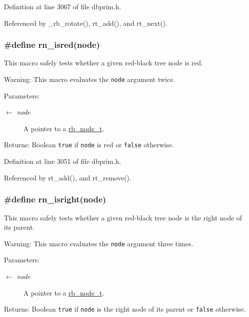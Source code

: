 Definition at line 3067 of file dbprim.h.

Referenced by \_\-rb\_\-rotate(), rt\_\-add(), and rt\_\-next().\hypertarget{group__dbprim__rbtree_ga41}{
\subsubsection[rn\_\-isred]{\setlength{\rightskip}{0pt plus 5cm}\#define rn\_\-isred(node)}}
\label{group__dbprim__rbtree_ga41}


This macro safely tests whether a given red-black tree node is red.

\begin{Desc}
\item[Warning:]This macro evaluates the {\tt node} argument twice.\end{Desc}
\begin{Desc}
\item[Parameters:]
\begin{description}
\item[\mbox{$\leftarrow$} {\em node}]A pointer to a \hyperlink{group__dbprim__rbtree_ga1}{rb\_\-node\_\-t}.\end{description}
\end{Desc}
\begin{Desc}
\item[Returns:]Boolean {\tt true} if {\tt node} is red or {\tt false} otherwise.\end{Desc}


Definition at line 3051 of file dbprim.h.

Referenced by rt\_\-add(), and rt\_\-remove().\hypertarget{group__dbprim__rbtree_ga43}{
\subsubsection[rn\_\-isright]{\setlength{\rightskip}{0pt plus 5cm}\#define rn\_\-isright(node)}}
\label{group__dbprim__rbtree_ga43}


This macro safely tests whether a given red-black tree node is the right node of its parent.

\begin{Desc}
\item[Warning:]This macro evaluates the {\tt node} argument three times.\end{Desc}
\begin{Desc}
\item[Parameters:]
\begin{description}
\item[\mbox{$\leftarrow$} {\em node}]A pointer to a \hyperlink{group__dbprim__rbtree_ga1}{rb\_\-node\_\-t}.\end{description}
\end{Desc}
\begin{Desc}
\item[Returns:]Boolean {\tt true} if {\tt node} is the right node of its parent or {\tt false} otherwise.\end{Desc}


